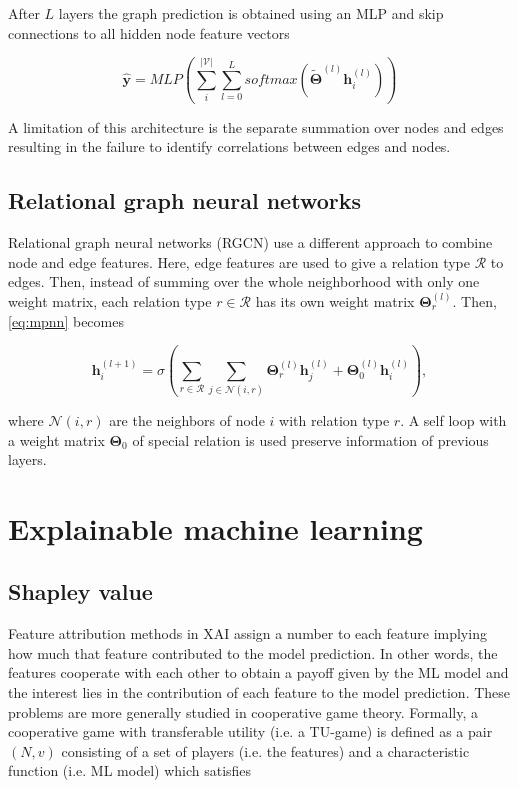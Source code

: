 After $L$ layers the graph prediction is obtained using an MLP and skip connections
to all hidden node feature vectors


\begin{equation}
	\hat{\pmb{y}} = MLP\left(\sum^{|\mathcal{V}|}_i \sum^L_{l=0} softmax\left(\tilde{\pmb{\Theta}}^{(l)} \pmb{h}^{(l)}_i\right)\right)
\end{equation}


A limitation of this architecture is the separate summation over nodes and edges
resulting in the failure to identify correlations between edges and nodes.\cite{wu2020comprehensive}


\subsection{Relational graph neural networks}


Relational graph neural networks (RGCN) use a different approach to combine node
and edge features. Here, edge features are used to give a relation type $\mathcal{R}$
to edges. Then, instead of summing over the whole neighborhood with only one
weight matrix, each relation type $r \in \mathcal{R}$ has its own weight matrix
$\pmb{\Theta}^{(l)}_r$. Then, \cref{eq:mpnn} becomes\cite{schlichtkrull2018modeling}


\begin{equation}
	\pmb{h}^{(l+1)}_i = \sigma \left( \sum_{r \in \mathcal{R}} \sum_{j \in \mathcal{N}(i, r)} \pmb{\Theta}^{(l)}_r \pmb{h}^{(l)}_j
	+ \pmb{\Theta}^{(l)}_0 \pmb{h}^{(l)}_i \right),
\end{equation}


where $\mathcal{N}(i, r)$ are the neighbors of node $i$ with relation type $r$.
A self loop with a weight matrix $\pmb{\Theta}_0$ of special relation
is used preserve information of previous layers.


\section{Explainable machine learning}


\subsection{Shapley value}
\label{subsec:shapley_value}

Feature attribution methods in XAI assign a number to each feature implying how
much that feature contributed to the model prediction.\cite{merrick2020explanation}
In other words, the features cooperate with each other to obtain a payoff given
by the ML model and the interest lies in the contribution of each feature to the
model prediction. These problems are more generally studied in cooperative game
theory. Formally, a cooperative game with transferable utility (i.e. a TU-game) is
defined as a pair $(N, v)$ consisting of a set of players (i.e. the features)
and a characteristic function (i.e. ML model) which satisfies\cite{zhang2022gstarx}


